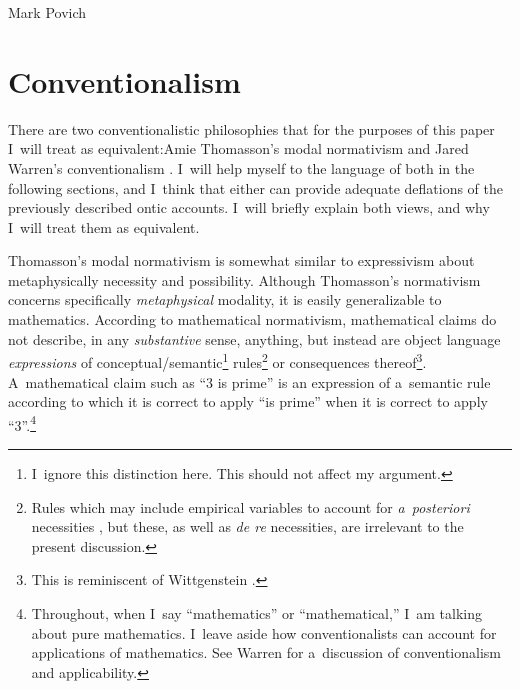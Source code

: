 \begin{artengenv}{Mark Povich}
\section{Conventionalism}
There are two conventionalistic philosophies that for the purposes of this paper I~will treat as equivalent:Amie Thomasson's
\parencites*[][]{thomasson_norms_2020}[][]{thomasson_how_2021} %
 modal normativism and Jared Warren's 
\parencite*[][]{warren_shadows_2020} %
 conventionalism 
\parencites[see also][]{kocurek_against_2020}[][]{sidelle_necessity_1989}. %
 I~will help myself to the language of both in the following sections, and I~think that either can provide adequate deflations of the previously described ontic accounts. I~will briefly explain both views, and why I~will treat them as equivalent.

Thomasson's
\parencites*[][]{thomasson_norms_2020}[][]{thomasson_how_2021} %
 modal normativism is somewhat similar to expressivism about metaphysically necessity and possibility. Although Thomasson's normativism concerns specifically \textit{metaphysical} modality, it is easily generalizable to mathematics. According to mathematical normativism, mathematical claims do not describe, in any \textit{substantive} sense, anything, but instead are object language \textit{expressions} of conceptual/semantic\footnote{I~ignore this distinction here. This should not affect my argument.} rules\footnote{Rules which may include empirical variables to account for \textit{a~posteriori} necessities 
\parencites[][]{sidelle_necessity_1989}[][]{thomasson_norms_2020}[][]{warren_priori_2022}, %
 but these, as well as \textit{de re} necessities, are irrelevant to the present discussion.} or consequences thereof\footnote{This is reminiscent of Wittgenstein 
\parencites*[][]{wittgenstein_remarks_1978}[][]{wittgenstein_tractatus_2013}.%
}. A~mathematical claim such as ``3 is prime'' is an expression of a~semantic rule according to which it is correct to apply ``is prime'' when it is correct to apply ``3''.\footnote{Throughout, when I~say ``mathematics'' or ``mathematical,'' I~am talking about pure mathematics. I~leave aside how conventionalists can account for applications of mathematics. See Warren 
\parencite*[][]{warren_shadows_2020} %
 for a~discussion of conventionalism and applicability.}


\end{artengenv}
